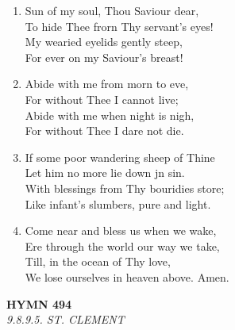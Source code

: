 \documentclass[11pt,a4paper]{article}
\begin{document}
\begin{enumerate}
    \item Sun of my soul, Thou Saviour dear, \\
        To hide Thee frorn Thy servant's eyes! \\
        My wearied eyelids gently steep, \\
        For ever on my Saviour's breast!

    \item Abide with me from morn to eve, \\
        For without Thee I cannot live; \\
        Abide with me when night is nigh, \\
        For without Thee I dare not die.

    \item If some poor wandering sheep of Thine \\
        Let him no more lie down jn sin. \\
        With blessings from Thy bouridies store; \\
        Like infant's slumbers, pure and light.

    \item Come near and bless us when we wake, \\
        Ere through the world our way we take, \\
        Till, in the ocean of Thy love, \\
        We lose ourselves in heaven above. Amen.

\end{enumerate}

\newpage
\begin{center}
    {\Large \textbf{HYMN 494}}
    \\
    \textit{9.8.9.5. ST. CLEMENT}
\end{center}
\vspace{1em}
\end{document}
